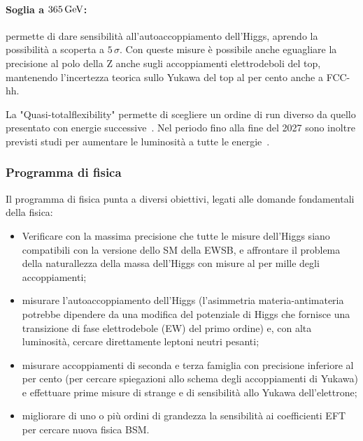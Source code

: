 \paragraph{Soglia a $365\,\mathrm{GeV}$:} permette di dare sensibilità all'autoaccoppiamento dell'Higgs, aprendo la possibilità a scoperta a $5\,\sigma$. Con queste misure è possibile anche eguagliare la precisione al polo della Z anche sugli accoppiamenti elettrodeboli del top, mantenendo l'incertezza teorica sullo Yukawa del top al per cento anche a FCC-hh.

La "Quasi-totalflexibility" permette di scegliere un ordine di run diverso da quello presentato con energie successive~\cite{FCC:FSR-v1}. Nel periodo fino alla fine del 2027 sono inoltre previsti studi per aumentare le luminosità a tutte le energie~\cite{FCC:FSR-v1}.

\subsubsection{Programma di fisica}
Il programma di fisica punta a diversi obiettivi, legati alle domande fondamentali della fisica:
\begin{itemize}
    \item Verificare con la massima precisione che tutte le misure dell'Higgs siano compatibili con la versione dello SM della EWSB, e affrontare il problema della naturallezza della massa dell'Higgs con misure al per mille degli accoppiamenti;
    \item misurare l'autoaccoppiamento dell'Higgs (l'asimmetria materia-antimateria potrebbe dipendere da una modifica del potenziale di Higgs che fornisce una transizione di fase elettrodebole (EW) del primo ordine) e, con alta luminosità, cercare direttamente leptoni neutri pesanti;
    \item misurare accoppiamenti di seconda e terza famiglia con precisione inferiore al per cento (per cercare spiegazioni allo schema degli accoppiamenti di Yukawa) e effettuare prime misure di strange e di sensibilità allo Yukawa dell'elettrone;
    \item migliorare di uno o più ordini di grandezza la sensibilità ai coefficienti EFT per cercare nuova fisica BSM. 
\end{itemize}

